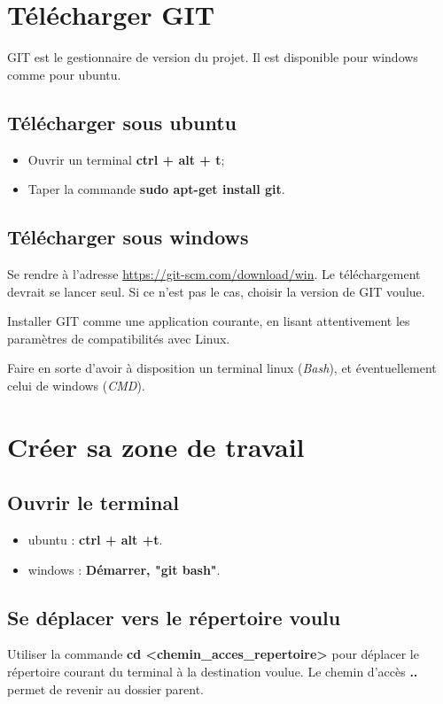 \section{Télécharger GIT}
GIT est le gestionnaire de version du projet. Il est disponible pour windows comme pour ubuntu.
\subsection{Télécharger sous ubuntu}
\begin{itemize}
\item Ouvrir un terminal \textbf{ctrl + alt + t};
\item Taper la commande \textbf{sudo apt-get install git}.
\end{itemize}

\subsection{Télécharger sous windows}
Se rendre à l'adresse \url{https://git-scm.com/download/win}. Le téléchargement devrait se lancer seul. Si ce n'est pas le cas, choisir la version de GIT voulue.

Installer GIT comme une application courante, en lisant attentivement les paramètres de compatibilités avec Linux.

Faire en sorte d'avoir à disposition un terminal linux (\textit{Bash}), et éventuellement celui de windows (\textit{CMD}).

\section{Créer sa zone de travail}
\subsection{Ouvrir le terminal}
\begin{itemize}
\item ubuntu : \textbf{ctrl + alt +t}.
\item windows : \textbf{Démarrer, "git bash"}.
\end{itemize}

\subsection{Se déplacer vers le répertoire voulu}
Utiliser la commande \textbf{cd <chemin\_acces\_repertoire>} pour déplacer le répertoire courant du terminal à la destination voulue. Le chemin d'accès \textbf{..} permet de revenir au dossier parent.

